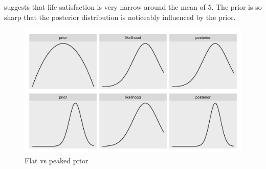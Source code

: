 \documentclass[a4, 12pt]{article}
\begin{document}
suggests that life satisfaction is very narrow around the mean of 5. The prior is so sharp that the posterior distribution is noticeably influenced by the prior.

\begin{figure}[H]

{\centering \includegraphics[width=0.8\linewidth,]{../figures/flat_peaked} 

}

\caption{Flat vs peaked prior}\label{fig:flat-peaked}
\end{figure}
\end{document}
